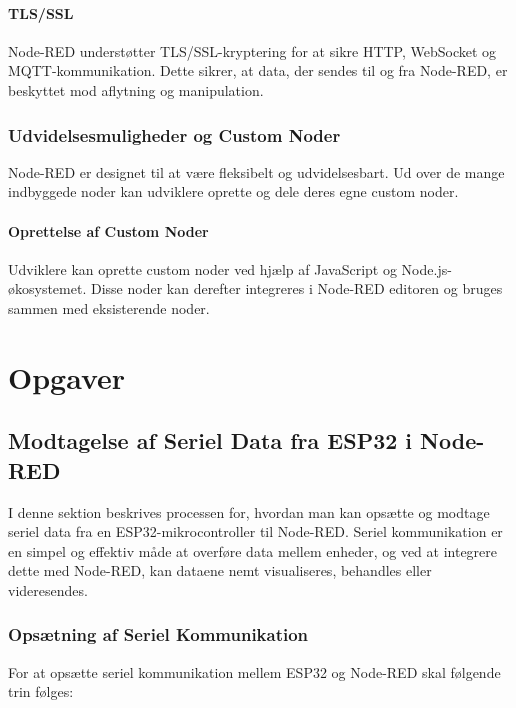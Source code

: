 \subsubsection{TLS/SSL}
Node-RED understøtter TLS/SSL-kryptering for at sikre HTTP, WebSocket og MQTT-kommunikation. Dette sikrer, at data, der sendes til og fra Node-RED, er beskyttet mod aflytning og manipulation.

\subsection{Udvidelsesmuligheder og Custom Noder}
Node-RED er designet til at være fleksibelt og udvidelsesbart. Ud over de mange indbyggede noder kan udviklere oprette og dele deres egne custom noder.

\subsubsection{Oprettelse af Custom Noder}
Udviklere kan oprette custom noder ved hjælp af JavaScript og Node.js-økosystemet. Disse noder kan derefter integreres i Node-RED editoren og bruges sammen med eksisterende noder.

\chapter{Opgaver}
\section{Modtagelse af Seriel Data fra ESP32 i Node-RED}
I denne sektion beskrives processen for, hvordan man kan opsætte og modtage seriel data fra en ESP32-mikrocontroller til Node-RED. Seriel kommunikation er en simpel og effektiv måde at overføre data mellem enheder, og ved at integrere dette med Node-RED, kan dataene nemt visualiseres, behandles eller videresendes.

\subsection{Opsætning af Seriel Kommunikation}
For at opsætte seriel kommunikation mellem ESP32 og Node-RED skal følgende trin følges:

